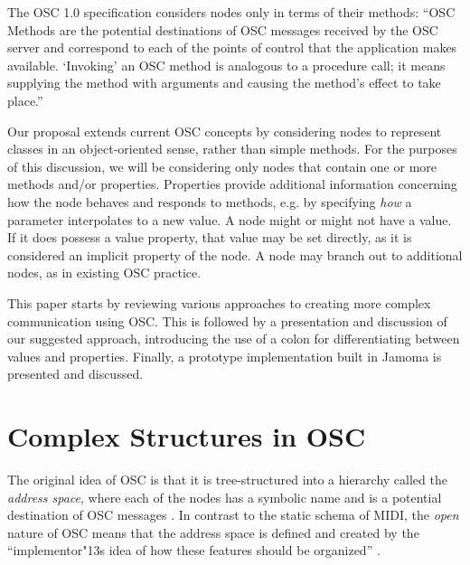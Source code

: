 \documentclass{NIME-alternate}
\begin{document}

The OSC 1.0 specification \cite{Wright:2002} considers nodes only in terms of their methods: ``OSC Methods are the potential destinations of OSC messages received by the OSC server and correspond to each of the points of control that the application makes available. `Invoking' an OSC method is analogous to a procedure call; it means supplying the method with arguments and causing the method's effect to take place.'' 

Our proposal extends current OSC concepts by considering nodes to represent classes in an object-oriented sense, rather than simple methods.  For the purposes of this discussion, we will be considering only nodes that contain one or more methods and/or properties.   Properties provide additional information concerning how the node behaves and responds to methods, e.g. by specifying \emph{how} a parameter interpolates to a new value. A node might or might not have a value. If it does possess a value property, that value may be set directly, as it is considered an implicit property of the node. A node may branch out to additional nodes, as in existing OSC practice.

This paper starts by reviewing various approaches to creating more complex communication using OSC. This is followed by a presentation and discussion of our suggested approach, introducing the use of a colon for differentiating between values and properties. Finally, a prototype implementation built in Jamoma is presented and discussed. 





\section{Complex Structures in OSC} %
\label{sec:complex_structures_in_OSC}


The original idea of OSC is that it is tree-structured into a hierarchy called the \emph{address space}, where each of the nodes has a symbolic name and is a potential destination of OSC messages \cite{Wright:1997}. In contrast to the static schema of MIDI, the \emph{open} nature of OSC means that the address space is defined and created by the ``implementor\char"13s idea of how these features should be organized'' \cite[p153]{Wright:2003}.
\end{document}
